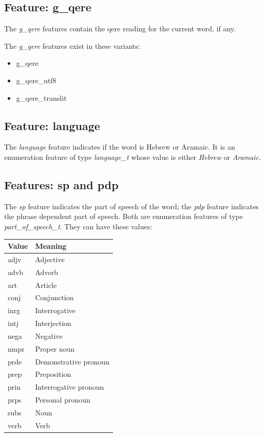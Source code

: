 \documentclass[11pt,oneside,a4paper]{memoir}
\begin{document}
\subsection{Feature: g\_qere}

The \emph{g\_qere} features contain the qere reading for the current word, if any.

The \emph{g\_qere} features exist in these variants:

\begin{itemize}
\item g\_qere
\item g\_qere\_utf8
\item g\_qere\_translit
\end{itemize}

\subsection{Feature: language}

The \emph{language} feature indicates if the word is Hebrew or Aramaic. It is an enumeration feature
of type \emph{language\_t} whose value is either \emph{Hebrew} or \emph{Aramaic.}

\subsection{Features: sp and pdp}

The \emph{sp} feature indicates the part of speech of the word; the \emph{pdp} feature indicates the
phrase dependent part of speech. Both are enumeration features of type \emph{part\_of\_speech\_t}.
They can have these values:

\begin{center}
  \begin{tabular}{ll}
    \textbf{Value} & \textbf{Meaning}\\
    \hline
    adjv & Adjective\\
    advb & Adverb\\
    art  & Article\\
    conj & Conjunction\\
    inrg & Interrogative\\
    intj & Interjection\\
    nega & Negative\\
    nmpr & Proper noun\\
    prde & Demonstrative pronoun\\
    prep & Preposition\\
    prin & Interrogative pronoun\\
    prps & Personal pronoun\\
    subs & Noun\\
    verb & Verb\\
  \end{tabular}
\end{center}
\end{document}
